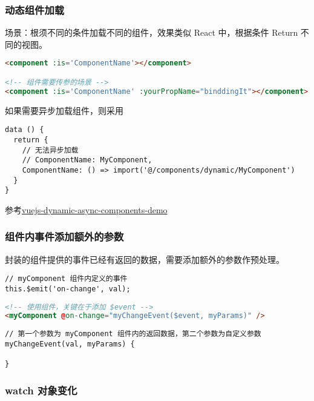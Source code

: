 \subsubsection{动态组件加载}\label{ux52a8ux6001ux7ec4ux4ef6ux52a0ux8f7d}

场景：根须不同的条件加载不同的组件，效果类似 React 中，根据条件 Return
不同的视图。

\begin{lstlisting}[language=HTML]
<component :is='ComponentName'></component>

<!-- 组件需要传参的场景 -->
<component :is='ComponentName' :yourPropName="binddingIt"></component>
\end{lstlisting}

如果需要异步加载组件，则采用

\begin{lstlisting}
data () {
  return {
    // 无法异步加载
    // ComponentName: MyComponent,
    ComponentName: () => import('@/components/dynamic/MyComponent')
  }
}
\end{lstlisting}

参考\href{https://github.com/lobo-tuerto/vuejs-dynamic-async-components-demo}{vuejs-dynamic-async-components-demo}

\subsubsection{组件内事件添加额外的参数}\label{ux7ec4ux4ef6ux5185ux4e8bux4ef6ux6dfbux52a0ux989dux5916ux7684ux53c2ux6570}

封装的组件提供的事件已经有返回的数据，需要添加额外的参数作预处理。

\begin{lstlisting}
// myComponent 组件内定义的事件
this.$emit('on-change', val);
\end{lstlisting}

\begin{lstlisting}[language=HTML]
<!-- 使用组件，关键在于添加 $event -->
<myComponent @on-change="myChangeEvent($event, myParams)" />
\end{lstlisting}

\begin{lstlisting}
// 第一个参数为 myComponent 组件内的返回数据，第二个参数为自定义参数
myChangeEvent(val, myParams) {

}
\end{lstlisting}

\subsubsection{watch 对象变化}\label{watch-ux5bf9ux8c61ux53d8ux5316}

